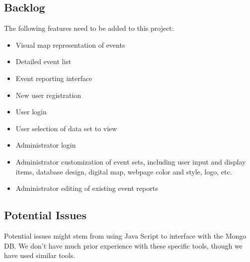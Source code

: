 \subsection{Backlog}
The following features need to be added to this project:
\begin{itemize}
\item Visual map representation of events
\item Detailed event list
\item Event reporting interface
\item New user registration
\item User login
\item User selection of data set to view
\item Administrator login
\item Administrator customization of event sets, including user input and display items, database design, digital map, webpage color and style, logo, etc. 
\item Administrator editing of existing event reports
\end{itemize}
\subsection{Potential Issues}
Potential issues might stem from using Java Script to interface with the Mongo DB. We don't have much prior experience with these specific tools, though we have used similar tools.